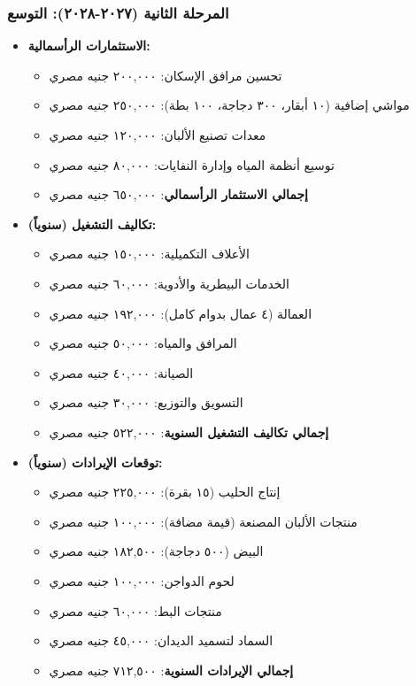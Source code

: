 \subsubsection{المرحلة الثانية (٢٠٢٧-٢٠٢٨): التوسع}
\begin{itemize}
    \item \textbf{الاستثمارات الرأسمالية:}
    \begin{itemize}
        \item تحسين مرافق الإسكان: ٢٠٠,٠٠٠ جنيه مصري
        \item مواشي إضافية (١٠ أبقار، ٣٠٠ دجاجة، ١٠٠ بطة): ٢٥٠,٠٠٠ جنيه مصري
        \item معدات تصنيع الألبان: ١٢٠,٠٠٠ جنيه مصري
        \item توسيع أنظمة المياه وإدارة النفايات: ٨٠,٠٠٠ جنيه مصري
        \item \textbf{إجمالي الاستثمار الرأسمالي}: ٦٥٠,٠٠٠ جنيه مصري
    \end{itemize}
    
    \item \textbf{تكاليف التشغيل (سنوياً):}
    \begin{itemize}
        \item الأعلاف التكميلية: ١٥٠,٠٠٠ جنيه مصري
        \item الخدمات البيطرية والأدوية: ٦٠,٠٠٠ جنيه مصري
        \item العمالة (٤ عمال بدوام كامل): ١٩٢,٠٠٠ جنيه مصري
        \item المرافق والمياه: ٥٠,٠٠٠ جنيه مصري
        \item الصيانة: ٤٠,٠٠٠ جنيه مصري
        \item التسويق والتوزيع: ٣٠,٠٠٠ جنيه مصري
        \item \textbf{إجمالي تكاليف التشغيل السنوية}: ٥٢٢,٠٠٠ جنيه مصري
    \end{itemize}
    
    \item \textbf{توقعات الإيرادات (سنوياً):}
    \begin{itemize}
        \item إنتاج الحليب (١٥ بقرة): ٢٢٥,٠٠٠ جنيه مصري
        \item منتجات الألبان المصنعة (قيمة مضافة): ١٠٠,٠٠٠ جنيه مصري
        \item البيض (٥٠٠ دجاجة): ١٨٢,٥٠٠ جنيه مصري
        \item لحوم الدواجن: ١٠٠,٠٠٠ جنيه مصري
        \item منتجات البط: ٦٠,٠٠٠ جنيه مصري
        \item السماد لتسميد الديدان: ٤٥,٠٠٠ جنيه مصري
        \item \textbf{إجمالي الإيرادات السنوية}: ٧١٢,٥٠٠ جنيه مصري
    \end{itemize}
    

\end{itemize}
